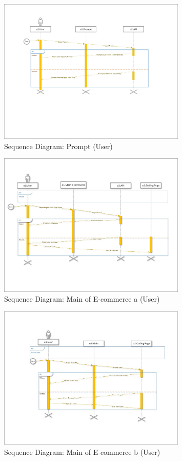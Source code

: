 \documentclass[12pt]{report}
\begin{document}
\begin{figure}[ht]
    \centering
    \includegraphics[width=0.8\textwidth]{Media/s1_Page_01.jpg} %
    \caption{Sequence Diagram: Prompt (User)}
    
    \label{fig:drawing1}
\end{figure}
\begin{figure}[ht]
    \centering
    \includegraphics[width=0.8\textwidth]{Media/s1_Page_02.jpg} %
    \caption{Sequence Diagram: Main of E-commerce a (User)}
    \label{fig:drawing1}
\end{figure}
\begin{figure}[ht]
    \centering
    \includegraphics[width=0.8\textwidth]{Media/s1_Page_03.jpg} %
    \caption{Sequence Diagram: Main of  E-commerce b (User)}
    \label{fig:drawing1}
\end{figure}
\end{document}
